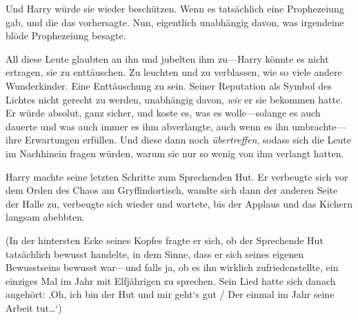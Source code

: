 Und Harry würde sie wieder beschützen. Wenn es tatsächlich eine Prophezeiung gab, und die das vorhersagte. Nun, eigentlich unabhängig davon, was irgendeine blöde Prophezeiung besagte.

All diese Leute glaubten an ihn und jubelten ihm zu—Harry könnte es nicht ertragen, sie zu enttäuschen. Zu leuchten und zu verblassen, wie so viele andere Wunderkinder. Eine Enttäuschung zu sein. Seiner Reputation als Symbol des Lichtes nicht gerecht zu werden, unabhängig davon, \emph{wie} er sie bekommen hatte. Er würde absolut, ganz sicher, und koste es, was es wolle—solange es auch dauerte und was auch immer es ihm abverlangte, auch wenn es ihn umbrachte—ihre Erwartungen erfüllen. Und diese dann noch \emph{übertreffen}, sodass sich die Leute im Nachhinein fragen würden, warum sie nur so wenig von ihm verlangt hatten.


Harry machte seine letzten Schritte zum Sprechenden Hut. Er verbeugte sich vor dem Orden des Chaos am Gryffindortisch, wandte sich dann der anderen Seite der Halle zu, verbeugte sich wieder und wartete, bis der Applaus und das Kichern langsam abebbten.

(In der hintersten Ecke seines Kopfes fragte er sich, ob der Sprechende Hut tatsächlich bewusst handelte, in dem Sinne, dass er sich seines eigenen Bewusstseins bewusst war—und falls ja, ob es ihn wirklich zufriedenstellte, ein einziges Mal im Jahr mit Elfjährigen zu sprechen. Sein Lied hatte sich danach angehört: ‚Oh, ich bin der Hut und mir geht‘s gut / Der einmal im Jahr seine Arbeit tut…‘)

